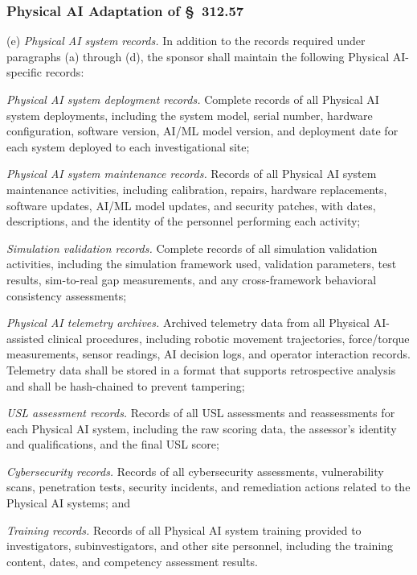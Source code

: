 \subsubsection{Physical AI Adaptation of \S~312.57}

(e) \textit{Physical AI system records.} In addition to the records required under paragraphs (a) through (d), the sponsor shall maintain the following Physical AI-specific records:

\begin{description}[leftmargin=0.8cm,style=sameline]
\item[(i)] \textit{Physical AI system deployment records.} Complete records of all Physical AI system deployments, including the system model, serial number, hardware configuration, software version, AI/ML model version, and deployment date for each system deployed to each investigational site;
\item[(ii)] \textit{Physical AI system maintenance records.} Records of all Physical AI system maintenance activities, including calibration, repairs, hardware replacements, software updates, AI/ML model updates, and security patches, with dates, descriptions, and the identity of the personnel performing each activity;
\item[(iii)] \textit{Simulation validation records.} Complete records of all simulation validation activities, including the simulation framework used, validation parameters, test results, sim-to-real gap measurements, and any cross-framework behavioral consistency assessments;
\item[(iv)] \textit{Physical AI telemetry archives.} Archived telemetry data from all Physical AI-assisted clinical procedures, including robotic movement trajectories, force/torque measurements, sensor readings, AI decision logs, and operator interaction records. Telemetry data shall be stored in a format that supports retrospective analysis and shall be hash-chained to prevent tampering;
\item[(v)] \textit{USL assessment records.} Records of all USL assessments and reassessments for each Physical AI system, including the raw scoring data, the assessor's identity and qualifications, and the final USL score;
\item[(vi)] \textit{Cybersecurity records.} Records of all cybersecurity assessments, vulnerability scans, penetration tests, security incidents, and remediation actions related to the Physical AI systems; and
\item[(vii)] \textit{Training records.} Records of all Physical AI system training provided to investigators, subinvestigators, and other site personnel, including the training content, dates, and competency assessment results.
\end{description}

